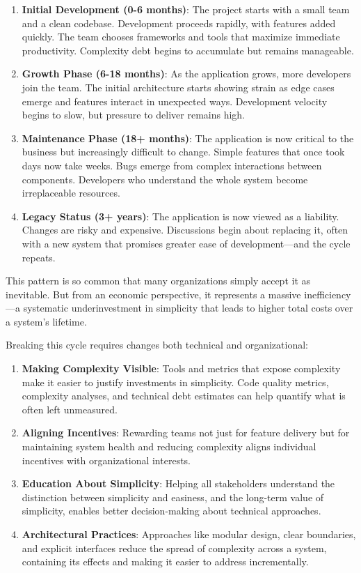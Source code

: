 \documentclass[11pt]{article}
\begin{document}
\begin{enumerate}
\item \textbf{Initial Development (0-6 months)}: The project starts with a small team and a clean codebase. Development proceeds rapidly, with features added quickly. The team chooses frameworks and tools that maximize immediate productivity. Complexity debt begins to accumulate but remains manageable.

\item \textbf{Growth Phase (6-18 months)}: As the application grows, more developers join the team. The initial architecture starts showing strain as edge cases emerge and features interact in unexpected ways. Development velocity begins to slow, but pressure to deliver remains high.

\item \textbf{Maintenance Phase (18+ months)}: The application is now critical to the business but increasingly difficult to change. Simple features that once took days now take weeks. Bugs emerge from complex interactions between components. Developers who understand the whole system become irreplaceable resources.

\item \textbf{Legacy Status (3+ years)}: The application is now viewed as a liability. Changes are risky and expensive. Discussions begin about replacing it, often with a new system that promises greater ease of development—and the cycle repeats.
\end{enumerate}

This pattern is so common that many organizations simply accept it as inevitable. But from an economic perspective, it represents a massive inefficiency—a systematic underinvestment in simplicity that leads to higher total costs over a system's lifetime.

Breaking this cycle requires changes both technical and organizational:

\begin{enumerate}
\item \textbf{Making Complexity Visible}: Tools and metrics that expose complexity make it easier to justify investments in simplicity. Code quality metrics, complexity analyses, and technical debt estimates can help quantify what is often left unmeasured.

\item \textbf{Aligning Incentives}: Rewarding teams not just for feature delivery but for maintaining system health and reducing complexity aligns individual incentives with organizational interests.

\item \textbf{Education About Simplicity}: Helping all stakeholders understand the distinction between simplicity and easiness, and the long-term value of simplicity, enables better decision-making about technical approaches.

\item \textbf{Architectural Practices}: Approaches like modular design, clear boundaries, and explicit interfaces reduce the spread of complexity across a system, containing its effects and making it easier to address incrementally.
\end{enumerate}
\end{document}
